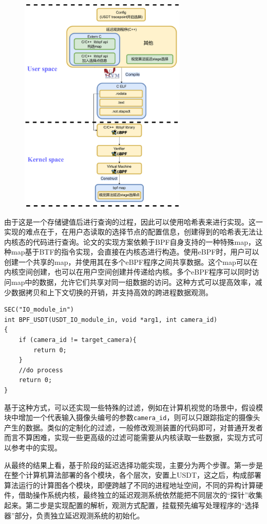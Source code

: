 \documentclass[master,anonymous]{shtthesis}
\begin{document}
\begin{figure}[htbp]
	\centering
	\includegraphics[width=8cm]{img/maps.pdf}
	\label{使用BPF-map实现采样点选择}
\end{figure}
由于这是一个存储键值后进行查询的过程，因此可以使用哈希表来进行实现。这一实现的难点在于，在用户态读取的选择节点的配置信息，创建得到的哈希表无法让内核态的代码进行查询。论文的实现方案依赖于BPF自身支持的一种特殊map，这种map基于BTF的指令实现，会直接在内核态进行构造。使用eBPF时，用户可以创建一个共享的map，并使用其在多个eBPF程序之间共享数据。这个map可以在内核空间创建，也可以在用户空间创建并传递给内核。多个eBPF程序可以同时访问map中的数据，允许它们共享对同一组数据的访问。这种方式可以提高效率，减少数据拷贝和上下文切换的开销，并支持高效的跨进程数据观测。

\begin{lstlisting}[caption={一种在BPF代码中的实现过滤的方法},captionpos=b]
SEC("IO_module_in")
int BPF_USDT(USDT_IO_module_in, void *arg1, int camera_id)
{
	if (camera_id != target_camera){
		return 0;
	}
	//do process
	return 0;
}
\end{lstlisting}

基于这种方式，可以还实现一些特殊的过滤，例如在计算机视觉的场景中，假设模块中增加一个代表输入摄像头编号的参数\verb*|camera_id|，则可以只跟踪指定的摄像头产生的数据。类似的定制化的过滤，一般修改观测装置的代码即可，对普通开发者而言不算困难，实现一些更高级的过滤可能需要从内核读取一些数据，实现方式可以参考\cite{stortrace}中的实现。


从最终的结果上看，基于阶段的延迟选择功能实现，主要分为两个步骤。第一步是在整个计算机算法部署的各个模块，各个层次，安置上USDT，这之后，构成部署算法运行的计算图各个模块，即便跨越了不同的进程地址空间，不同的异构计算硬件，借助操作系统内核，最终独立的延迟观测系统依然能把不同层次的“探针”收集起来。第二步是实现配置的解析，观测方式配置，挂载预先编写处理程序的“选择器”部分，负责独立延迟观测系统的初始化。
\end{document}
